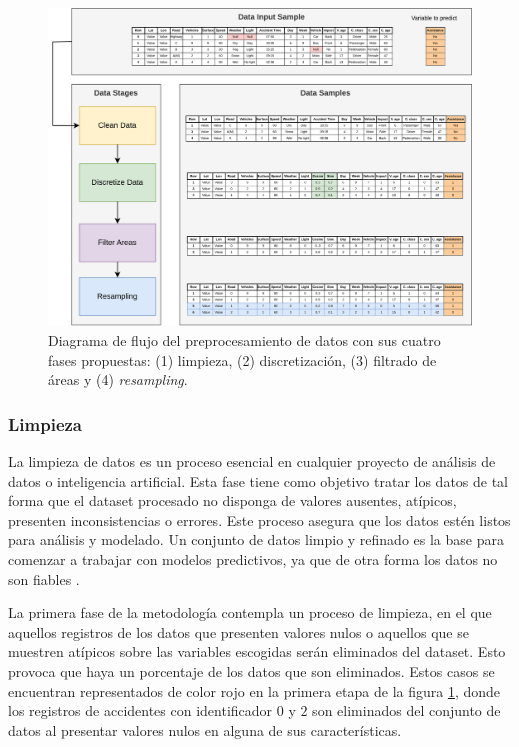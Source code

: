 \documentclass{uathesis-es}
\begin{document}
\begin{figure}[H]
    \centering
    \includegraphics[width=17cm]{Figures/Preprocessing.png}
    \caption{Diagrama de flujo del preprocesamiento de datos con sus cuatro fases propuestas: (1) limpieza, (2) discretización, (3) filtrado de áreas y (4) \textit{resampling}.}
    \label{PreprocessingStage}
\end{figure}

\subsubsection{Limpieza}

La limpieza de datos es un proceso esencial en cualquier proyecto de análisis de datos o inteligencia artificial. Esta fase tiene como objetivo tratar los datos de tal forma que el dataset procesado no disponga de valores ausentes, atípicos, presenten inconsistencias o errores. Este proceso asegura que los datos estén listos para análisis y modelado. Un conjunto de datos limpio y refinado es la base para comenzar a trabajar con modelos predictivos, ya que de otra forma los datos no son fiables \cite{ilyas2019data}.

La primera fase de la metodología contempla un proceso de limpieza, en el que aquellos registros de los datos que presenten valores nulos o aquellos que se muestren atípicos sobre las variables escogidas serán eliminados del dataset. Esto provoca que haya un porcentaje de los datos que son eliminados. Estos casos se encuentran representados de color rojo en la primera etapa de la figura \ref{PreprocessingStage}, donde los registros de accidentes con identificador $0$ y $2$ son eliminados del conjunto de datos al presentar valores nulos en alguna de sus características.
\end{document}
